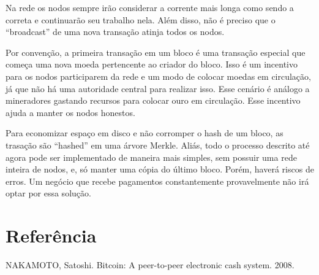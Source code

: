 \documentclass[12pt]{article}
\begin{document}
Na rede os nodos sempre irão considerar a corrente mais longa como sendo a
correta e continuarão seu trabalho nela. Além disso, não é preciso que o
``broadcast'' de uma nova transação atinja todos os nodos.

Por convenção, a primeira transação em um bloco é uma transação especial que
começa uma nova moeda pertencente ao criador do bloco. Isso é um incentivo para
os nodos participarem da rede e um modo de colocar moedas em circulação, já que
não há uma autoridade central para realizar isso. Esse cenário é análogo a
mineradores gastando recursos para colocar ouro em circulação. Esse incentivo
ajuda a manter os nodos honestos.

Para economizar espaço em disco e não corromper o hash de um bloco, as trasação
são ``hashed'' em uma árvore Merkle. Aliás, todo o processo descrito até agora
pode ser implementado de maneira mais simples, sem possuir uma rede inteira de
nodos, e, só manter uma cópia do último bloco. Porém, haverá riscos de erros. Um
negócio que recebe pagamentos constantemente provavelmente não irá optar por
essa solução.



\section*{Referência}
NAKAMOTO, Satoshi. Bitcoin: A peer-to-peer electronic cash system. 2008.
\end{document}
